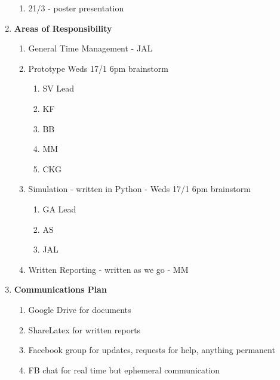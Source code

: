 \begin{enumerate}
\begin{enumerate}
\item  21/3 - poster presentation\\
\end{enumerate}

\item  \textbf{Areas of Responsibility}

\begin{enumerate}
\item General Time Management - JAL

\item  Prototype Weds 17/1 6pm brainstorm

\begin{enumerate}
\item  SV Lead

\item  KF

\item  BB

\item  MM

\item  CKG
\end{enumerate}

\item  Simulation - written in Python - Weds 17/1 6pm brainstorm

\begin{enumerate}
\item  GA Lead

\item  AS

\item  JAL
\end{enumerate}

\item  Written Reporting - written as we go - MM\\
\end{enumerate}

\item  \textbf{Communications Plan}

\begin{enumerate}
\item Google Drive for documents

\item  ShareLatex for written reports

\item  Facebook group for updates, requests for help, anything permanent

\item  FB chat for real time but ephemeral communication\\
\end{enumerate}


\end{enumerate}
